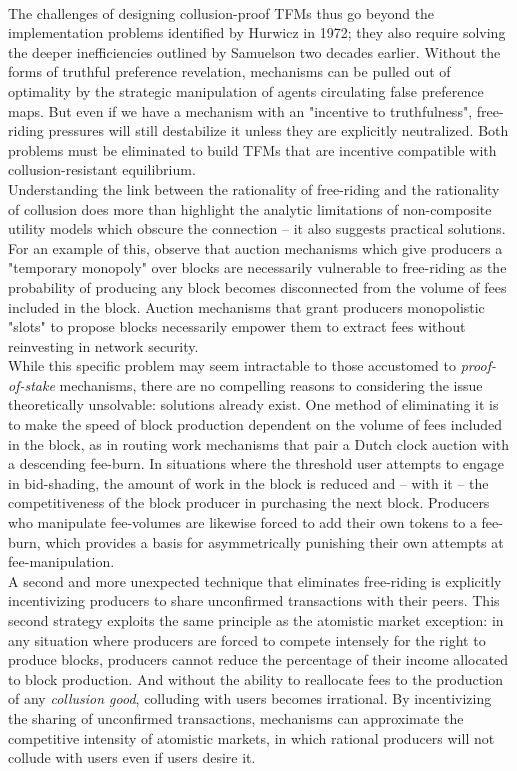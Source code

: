 \documentclass[11pt,a4paper]{llncs}
\begin{document}
\vspace{0.2cm} \\
The challenges of designing collusion-proof TFMs thus go beyond the implementation problems identified by Hurwicz in 1972; they also require solving the deeper inefficiencies outlined by Samuelson two decades earlier. Without the forms of truthful preference revelation, mechanisms can be pulled out of optimality by the strategic manipulation of agents circulating false preference maps. But even if we have a mechanism with an "incentive to truthfulness", free-riding pressures will still destabilize it unless they are explicitly neutralized. Both problems must be eliminated to build TFMs that are incentive compatible with collusion-resistant equilibrium.
\vspace{0.2cm} \\
Understanding the link between the rationality of free-riding and the rationality of collusion does more than highlight the analytic limitations of non-composite utility models which obscure the connection -- it also suggests practical solutions. For an example of this, observe that auction mechanisms which give producers a "temporary monopoly" over blocks are necessarily vulnerable to free-riding as the probability of producing any block becomes disconnected from the volume of fees included in the block. Auction mechanisms that grant producers monopolistic "slots" to propose blocks necessarily empower them to extract fees without reinvesting in network security.
\vspace{0.2cm} \\
While this specific problem may seem intractable to those accustomed to \textit{proof-of-stake} mechanisms, there are no compelling reasons to considering the issue theoretically unsolvable: solutions already exist. One method of eliminating it is to make the speed of block production dependent on the volume of fees included in the block, as in routing work mechanisms that pair a Dutch clock auction with a descending fee-burn. In situations where the threshold user attempts to engage in bid-shading, the amount of work in the block is reduced and -- with it -- the competitiveness of the block producer in purchasing the next block. Producers who manipulate fee-volumes are likewise forced to add their own tokens to a fee-burn, which provides a basis for asymmetrically punishing their own attempts at fee-manipulation.
\vspace{0.2cm} \\
A second and more unexpected technique that eliminates free-riding is explicitly incentivizing producers to share unconfirmed transactions with their peers. This second strategy exploits the same principle as the atomistic market exception: in any situation where producers are forced to compete intensely for the right to produce blocks, producers cannot reduce the percentage of their income allocated to block production. And without the ability to reallocate fees to the production of any \textit{collusion good}, colluding with users becomes irrational. By incentivizing the sharing of unconfirmed transactions, mechanisms can approximate the competitive intensity of atomistic markets, in which rational producers will not collude with users even if users desire it.
\end{document}
